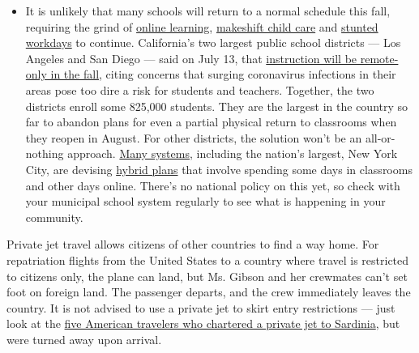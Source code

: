 \begin{itemize}
  \begin{itemize}
  \tightlist
  \item
    It is unlikely that many schools will return to a normal schedule
    this fall, requiring the grind of
    \href{https://www.nytimes3xbfgragh.onion/2020/06/05/us/coronavirus-education-lost-learning.html?action=click\&pgtype=Article\&state=default\&region=MAIN_CONTENT_3\&context=storylines_faq}{online
    learning},
    \href{https://www.nytimes3xbfgragh.onion/2020/05/29/us/coronavirus-child-care-centers.html?action=click\&pgtype=Article\&state=default\&region=MAIN_CONTENT_3\&context=storylines_faq}{makeshift
    child care} and
    \href{https://www.nytimes3xbfgragh.onion/2020/06/03/business/economy/coronavirus-working-women.html?action=click\&pgtype=Article\&state=default\&region=MAIN_CONTENT_3\&context=storylines_faq}{stunted
    workdays} to continue. California's two largest public school
    districts --- Los Angeles and San Diego --- said on July 13, that
    \href{https://www.nytimes3xbfgragh.onion/2020/07/13/us/lausd-san-diego-school-reopening.html?action=click\&pgtype=Article\&state=default\&region=MAIN_CONTENT_3\&context=storylines_faq}{instruction
    will be remote-only in the fall}, citing concerns that surging
    coronavirus infections in their areas pose too dire a risk for
    students and teachers. Together, the two districts enroll some
    825,000 students. They are the largest in the country so far to
    abandon plans for even a partial physical return to classrooms when
    they reopen in August. For other districts, the solution won't be an
    all-or-nothing approach.
    \href{https://bioethics.jhu.edu/research-and-outreach/projects/eschool-initiative/school-policy-tracker/}{Many
    systems}, including the nation's largest, New York City, are
    devising
    \href{https://www.nytimes3xbfgragh.onion/2020/06/26/us/coronavirus-schools-reopen-fall.html?action=click\&pgtype=Article\&state=default\&region=MAIN_CONTENT_3\&context=storylines_faq}{hybrid
    plans} that involve spending some days in classrooms and other days
    online. There's no national policy on this yet, so check with your
    municipal school system regularly to see what is happening in your
    community.
  \end{itemize}
\end{itemize}

Private jet travel allows citizens of other countries to find a way
home. For repatriation flights from the United States to a country where
travel is restricted to citizens only, the plane can land, but Ms.
Gibson and her crewmates can't set foot on foreign land. The passenger
departs, and the crew immediately leaves the country. It is not advised
to use a private jet to skirt entry restrictions --- just look at the
\href{https://www.nytimes3xbfgragh.onion/2020/07/07/world/europe/american-passport-privilege-coronavirus.html}{five
American travelers who chartered a private jet to Sardinia}, but were
turned away upon arrival.

